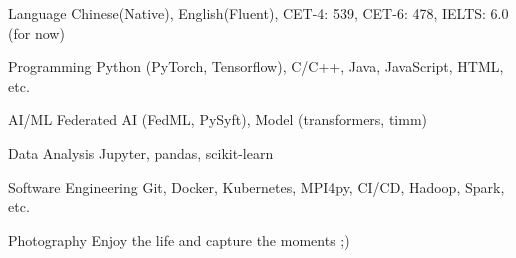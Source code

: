 

\begin{cvskills}

\cvskill
{Language} %
{Chinese(Native), English(Fluent), CET-4: 539, CET-6: 478, IELTS: 6.0 (for now)} %

\cvskill
{Programming} %
{Python (PyTorch, Tensorflow), C/C++, Java, JavaScript, HTML, etc.} %

\cvskill
{AI/ML} %
{Federated AI (FedML, PySyft), Model (transformers, timm)} %

\cvskill
{Data Analysis} %
{Jupyter, pandas, scikit-learn} %

\cvskill
{Software Engineering} %
{Git, Docker, Kubernetes, MPI4py, CI/CD, Hadoop, Spark, etc.} %

\cvskill
{Photography} %
{Enjoy the life and capture the moments ;)} %


\end{cvskills}